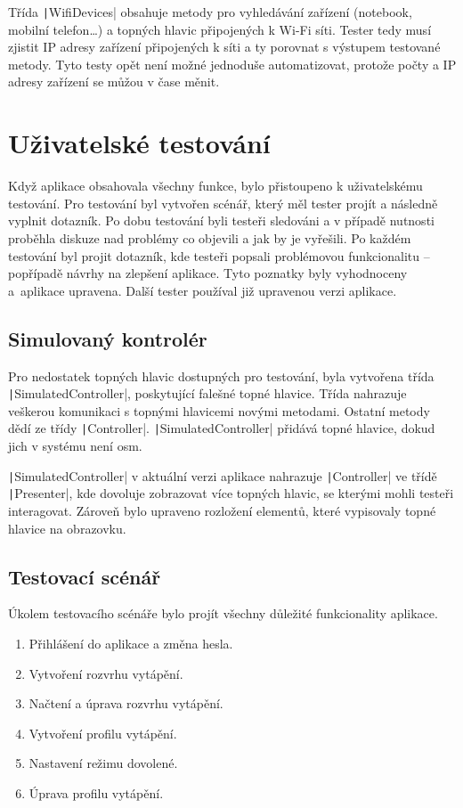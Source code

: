 \documentclass[thesis=B,czech]{FITthesis}[2012/10/20]
\begin{document}
Třída \texttt|WifiDevices| obsahuje metody pro vyhledávání zařízení (notebook, mobilní telefon\dots{}) a topných hlavic připojených k Wi-Fi síti. Tester tedy musí zjistit IP adresy zařízení připojených k síti a ty porovnat s výstupem testované metody. Tyto testy opět není možné jednoduše automatizovat, protože počty a IP adresy zařízení se můžou v čase měnit.


\section{Uživatelské testování}

Když aplikace obsahovala všechny funkce, bylo přistoupeno k uživatelskému testování. Pro testování byl vytvořen scénář, který měl tester projít a následně vyplnit dotazník. Po dobu testování byli testeři sledováni a v případě nutnosti proběhla diskuze nad problémy co objevili a jak by je vyřešili. Po každém testování byl projit dotazník, kde testeři popsali problémovou funkcionalitu – popřípadě návrhy na zlepšení aplikace. Tyto poznatky byly vyhodnoceny a~aplikace upravena. Další tester používal již upravenou verzi aplikace.

\subsection{Simulovaný kontrolér}

Pro nedostatek topných hlavic dostupných pro testování, byla vytvořena třída \texttt|SimulatedController|, poskytující falešné topné hlavice. Třída nahrazuje veškerou komunikaci s topnými hlavicemi novými metodami. Ostatní metody dědí ze třídy \texttt|Controller|. \texttt|SimulatedController| přidává topné hlavice, dokud jich v systému není osm.

\texttt|SimulatedController| v aktuální verzi aplikace nahrazuje \texttt|Controller| ve třídě \texttt|Presenter|, kde dovoluje zobrazovat více topných hlavic, se kterými mohli testeři interagovat. Zároveň bylo upraveno rozložení elementů, které vypisovaly topné hlavice na obrazovku.

\subsection{Testovací scénář}

Úkolem testovacího scénáře bylo projít všechny důležité funkcionality aplikace.

\begin{enumerate}
\item Přihlášení do aplikace a změna hesla.
\item Vytvoření rozvrhu vytápění.
\item Načtení a úprava rozvrhu vytápění.
\item Vytvoření profilu vytápění.
\item Nastavení režimu dovolené.
\item Úprava profilu vytápění.
\end{enumerate}
\end{document}
